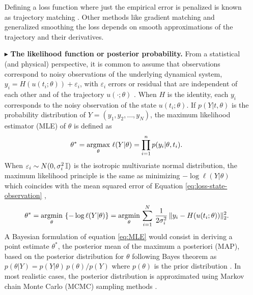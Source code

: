 \begin{itemize}
    Defining a loss function where just the empirical error is penalized is known as trajectory matching \cite{ramsay2017dynamic}. 
    Other methods like gradient matching and generalized smoothing the loss depends on smooth approximations of the trajectory and their derivatives. 
    \item[$ \blacktriangleright$] \textbf{The likelihood function or posterior probability.} From a statistical (and physical) perspective, it is common to assume that observations correspond to noisy observations of the underlying dynamical system, $y_i = H(u(t_i; \theta)) + \varepsilon_i$, with $\varepsilon_i$ errors or residual that are independent of each other and of the trajectory $u(\cdot ; \theta)$ \cite{ramsay2017dynamic}.
    When $H$ is the identity, each $y_i$ corresponds to the noisy observation of the state $u(t_i; \theta)$.
    If $p(Y | t , \theta)$ is the probability distribution of $Y=(y_1, y_2, \ldots, y_N)$, 
    the maximum likelihood estimator (MLE) of $\theta$ is defined as 
    \begin{equation}
        \theta^* 
        = 
        \underset{\theta}{\text{argmax}} \,\, \ell (Y | \theta) 
        = 
        \prod_{i=1}^n p(y_i | \theta, t_i) .
    \end{equation}
    When $\varepsilon_i \sim N(0, \sigma_i^2 \operatorname{\mathbb{I}})$ is the isotropic multivariate normal distribution, the maximum likelihood principle is the same as minimizing $- \log \ell(Y | \theta)$ which coincides with the mean squared error of Equation \eqref{eq:loss-state-observation} \cite{hastie2009elements},
    \begin{equation}
        \theta^* 
        = 
        \underset{\theta}{\text{argmin}} \, \left \{ - \log \ell (Y | \theta) \right \}
        = 
        \underset{\theta}{\text{argmin}} \, \sum_{i=1}^N 
        \, \frac{1}{2\sigma_i^2} \,
        \| y_i - H(u(t_i; \theta)) \|_2^2 .
        \label{eq:MLE}
    \end{equation}
    A Bayesian formulation of equation \eqref{eq:MLE} would consist in deriving a point estimate $\theta^*$, the posterior mean of the maximum a posteriori (MAP), based on the posterior distribution for $\theta$ following Bayes theorem as $p(\theta | Y) = {p(Y | \theta) \, p (\theta)}/{p(Y)}$ where $p(\theta)$ is the prior distribution \cite{pml1Book}.
    In most realistic cases, the posterior distribution is approximated using Markov chain Monte Carlo (MCMC) sampling methods \cite{gelman2013bayesian}. 

\end{itemize}

